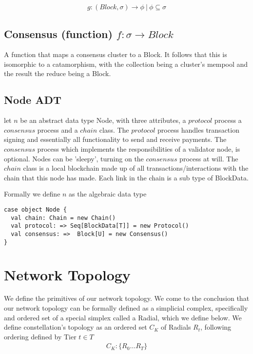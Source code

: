 \documentclass{article}
\begin{document}
\begin{equation} \label{eq1}
\begin{split}
g: (Block, \sigma) \rightarrow \phi \ | \ \phi \subseteq \sigma
\end{split}
\end{equation}


\subsection{Consensus (function) $f: \sigma \rightarrow  Block$}
A function that maps a consensus cluster to a Block. It follows that this is isomorphic to a catamorphism, with the collection being a cluster's mempool and the result the reduce being a Block.

\subsection{Node ADT}
let $n$ be an abstract data type Node, with three attributes, a $protocol$ process a $consensus$ process and a $chain$ class. The $protocol$ process handles transaction signing and essentially all functionality to send and receive payments. The $consensus$ process which implements the responsibilities of a validator node, is optional. Nodes can be 'sleepy', turning on the $consensus$ process at will. The $chain$ class is a local blockchain made up of all transactions/interactions with the chain that this node has made. Each link in the chain is a sub type of BlockData.

Formally we define $n$ as the algebraic data type

\begin{lstlisting}
case object Node {
  val chain: Chain = new Chain()
  val protocol: => Seq[BlockData[T]] = new Protocol()
  val consensus: =>  Block[U] = new Consensus()
}
\end{lstlisting}

\section{Network Topology}
We define the primitives of our network topology. We come to the conclusion that our network topology can be formally defined as a simplicial complex, specifically and ordered set of a special simplex called a Radial, which we define below. We define constellation's topology as an ordered set $C_K$ of Radials $R_t$, following ordering defined by Tier $t \in T$
\begin{equation} \label{eq1}
\begin{split}
C_K: \{R_0 \dots R_T \}
\end{split}
\end{equation}
\end{document}
